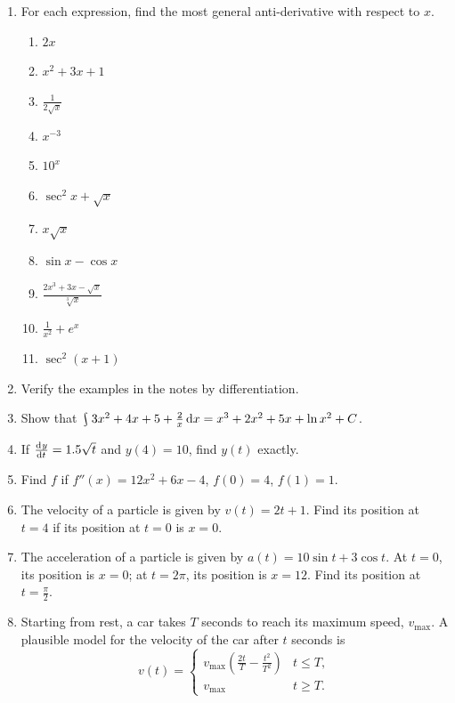 \begin{enumerate}
  \item For each expression, find the most general anti-derivative with respect to $ x $.
    \begin{multicols}{2}
    \begin{enumerate}
      \item $ 2x $
      \item $ x^2 + 3x + 1 $
      \item $ \frac{1}{2\sqrt{x}} $
      \item $ x^{-3} $
      \item $ 10^x $
      \item $ \sec^2 x + \sqrt{x} $
      \item $ x\sqrt{x} $
      \item $ \sin x - \cos x $
      \item $ \frac{2x^3 + 3x - \sqrt{x}}{\sqrt[3]{x}} $
      \item $ \frac{1}{x^2} + e^x $
      \item $ \sec^2 (x + 1) $
    \end{enumerate}
    \end{multicols}
  \item Verify the examples in the notes by differentiation.
  \item Show that $ \rint 3x^2 + 4x + 5 + \frac{2}{x} \dif{x} = x^3 + 2x^2 + 5x + \ln x^2 + C $.
  \item If $ \od{y}{t} = 1.5 \sqrt{t} $ and $ y(4) = 10 $, find $ y(t) $ exactly.
  \item Find $ f $ if $ f''(x) = 12x^2 + 6x - 4 $, $ f(0) = 4 $, $ f(1) = 1 $.
  \item The velocity of a particle is given by $ v(t) = 2t + 1 $. Find its position at $ t = 4 $
        if its position at $ t = 0 $ is $ x = 0 $.
  \item The acceleration of a particle is given by $ a(t) = 10\sin t + 3\cos t $. At $ t = 0 $, its position is $ x = 0 $; at $ t = 2\pi $,
        its position is $ x = 12 $. Find its position at $ t = \frac{\pi}{2} $.
  \item Starting from rest, a car takes $ T $ seconds to reach its maximum speed, $ v_\text{max} $. A plausible
        model for the velocity of the car after $ t $ seconds is
        \begin{displaymath}
          v(t) = \begin{cases} v_\text{max} \left( \frac{2t}{T} - \frac{t^2}{T^2} \right) & t \leq T, \\ v_\text{max} & t \geq T. \end{cases}

\end{displaymath}
\end{enumerate}
